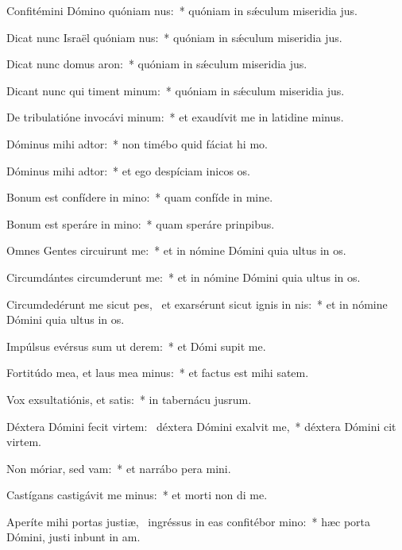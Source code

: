 \item Confitémini Dómino quóniam nus:~* quóniam in sǽculum miseridia jus.
\item Dicat nunc Israël quóniam nus:~* quóniam in sǽculum miseridia jus.
\item Dicat nunc domus aron:~* quóniam in sǽculum miseridia jus.
\item Dicant nunc qui timent minum:~* quóniam in sǽculum miseridia jus.
\item De tribulatióne invocávi minum:~* et exaudívit me in latidine minus.
\item Dóminus mihi adtor:~* non timébo quid fáciat hi mo.
\item Dóminus mihi adtor:~* et ego despíciam inicos os.
\item Bonum est confídere in mino:~* quam confíde in mine.
\item Bonum est speráre in mino:~* quam speráre  prinpibus.
\item Omnes Gentes circuirunt me:~* et in nómine Dómini quia ultus  in os.
\item Circumdántes circumderunt me:~* et in nómine Dómini quia ultus  in os.
\item Circumdedérunt me sicut pes,~\pscross{} et exarsérunt sicut ignis in nis:~* et in nómine Dómini quia ultus  in os.
\item Impúlsus evérsus sum ut derem:~* et Dómi supit me.
\item Fortitúdo mea, et laus mea minus:~* et factus est mihi  satem.
\item Vox exsultatiónis, et satis:~* in tabernácu jusrum.
\item Déxtera Dómini fecit virtem:~\pscross{} déxtera Dómini exalvit me,~* déxtera Dómini cit virtem.
\item Non móriar, sed vam:~* et narrábo pera mini.
\item Castígans castigávit me minus:~* et morti non di me.
\item Aperíte mihi portas justiæ,~\pscross{} ingréssus in eas confitébor mino:~* hæc porta Dómini, justi inbunt in am.
